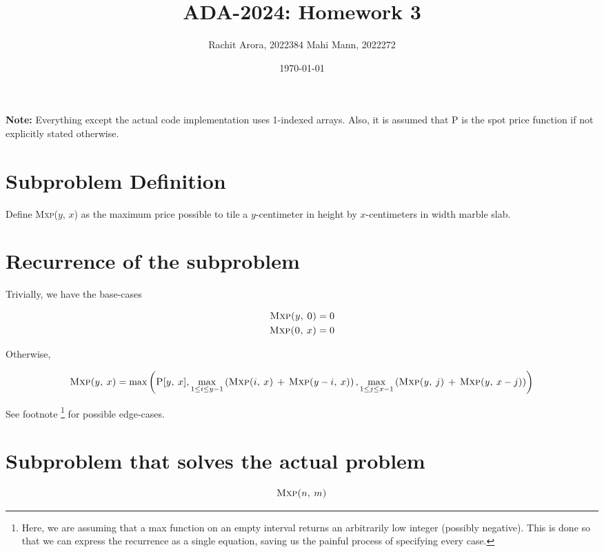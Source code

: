 \documentclass{article}
\title{ADA-2024: Homework 3}
\author{Rachit Arora, 2022384 \cr Mahi Mann, 2022272}
\date{\today}
\begin{document}
\maketitle

\textbf{Note:} Everything except the actual code implementation uses 1-indexed arrays. Also, it is assumed that \textsc{P} is the spot price function if not explicitly stated otherwise. 

\section{Subproblem Definition}

Define \textsc{Mxp($y$, $x$)} as the maximum price possible to tile a $y$-centimeter in height by $x$-centimeters in width marble slab.

\section{Recurrence of the subproblem}

Trivially, we have the base-cases 

\begin{align*}
    \textsc{Mxp($y$, 0)} = 0 \\
    \textsc{Mxp(0, $x$)} = 0
\end{align*}

Otherwise, 

\begin{align*}
    \textsc{Mxp($y$, $x$)} = \max\left(\textsc{P[$y$, $x$]}, \max_{1 \leq i \leq y-1}\left(\textsc{Mxp($i$, $x$) + Mxp($y-i$, $x$)}\right), \max_{1 \leq j \leq x-1}\left(\textsc{Mxp($y$, $j$) + Mxp($y$, $x-j$)}\right)\right)
\end{align*}

See footnote \footnote{Here, we are assuming that a max function on an empty interval returns an arbitrarily low integer (possibly negative). This is done so that we can express the recurrence as a single equation, saving us the painful process of specifying every case.} for possible edge-cases.

\section{Subproblem that solves the actual problem}

\begin{align*}
    \textsc{Mxp($n$, $m$)}
\end{align*}
\end{document}
